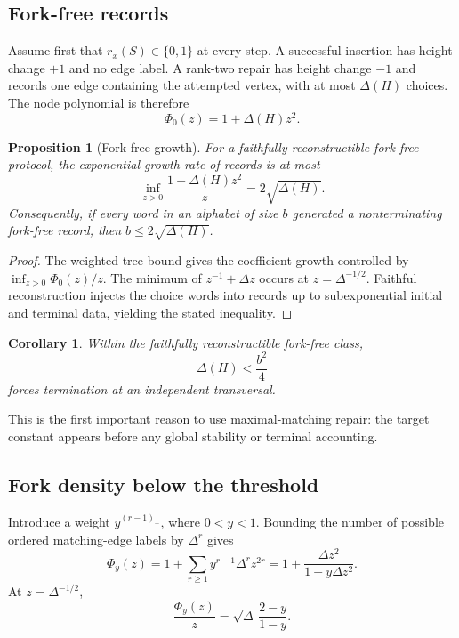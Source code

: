 \documentclass[11pt]{article}
\newtheorem{proposition}[theorem]{Proposition}
\newtheorem{corollary}[theorem]{Corollary}
\begin{document}
\subsection{Fork-free records}

Assume first that \(r_x(S)\in\{0,1\}\) at every step.  A successful insertion
has height change \(+1\) and no edge label.  A rank-two repair has height change
\(-1\) and records one edge containing the attempted vertex, with at most
\(\Delta(H)\) choices.  The node polynomial is therefore
\[
  \Phi_0(z)=1+\Delta(H)z^2.
\]

\begin{proposition}[Fork-free growth]\label{prop:fork-free}
For a faithfully reconstructible fork-free protocol, the exponential growth
rate of records is at most
\[
  \inf_{z>0}\frac{1+\Delta(H)z^2}{z}=2\sqrt{\Delta(H)}.
\]
Consequently, if every word in an alphabet of size \(b\) generated a
nonterminating fork-free record, then \(b\le2\sqrt{\Delta(H)}\).
\end{proposition}

\begin{proof}
The weighted tree bound gives the coefficient growth controlled by
\(\inf_{z>0}\Phi_0(z)/z\).  The minimum of \(z^{-1}+\Delta z\) occurs at
\(z=\Delta^{-1/2}\).  Faithful reconstruction injects the choice words into
records up to subexponential initial and terminal data, yielding the stated
inequality.
\end{proof}

\begin{corollary}\label{cor:fork-free-quarter}
Within the faithfully reconstructible fork-free class,
\[
  \Delta(H)<\frac{b^2}{4}
\]
forces termination at an independent transversal.
\end{corollary}

This is the first important reason to use maximal-matching repair: the target
constant appears before any global stability or terminal accounting.

\subsection{Fork density below the threshold}

Introduce a weight \(y^{(r-1)_+}\), where \(0<y<1\).  Bounding the number of
possible ordered matching-edge labels by \(\Delta^r\) gives
\[
  \Phi_y(z)
  =1+\sum_{r\ge1}y^{r-1}\Delta^r z^{2r}
  =1+\frac{\Delta z^2}{1-y\Delta z^2}.
\]
At \(z=\Delta^{-1/2}\),
\begin{equation}\label{eq:weighted-growth}
  \frac{\Phi_y(z)}{z}
  =\sqrt\Delta\,\frac{2-y}{1-y}.
\end{equation}
\end{document}
